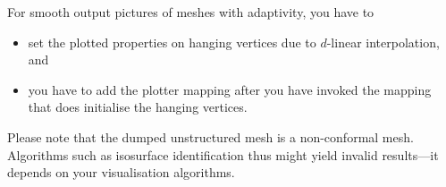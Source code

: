 \begin{remark}
  For smooth output pictures of meshes with adaptivity, you have to 
  \begin{itemize}
    \item set the plotted properties on hanging vertices due to $d$-linear
    interpolation, and
    \item you have to add the plotter mapping after you have invoked the mapping
    that does initialise the hanging vertices.
  \end{itemize}
\end{remark}


\noindent
Please note that the dumped unstructured mesh is a non-conformal mesh. 
Algorithms such as isosurface identification thus might yield invalid
results---it depends on your visualisation algorithms.


